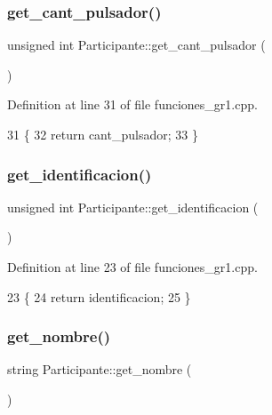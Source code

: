\subsubsection{\texorpdfstring{get\+\_\+cant\+\_\+pulsador()}{get\_cant\_pulsador()}}
{\footnotesize\ttfamily unsigned int Participante\+::get\+\_\+cant\+\_\+pulsador (\begin{DoxyParamCaption}{ }\end{DoxyParamCaption})}



Definition at line 31 of file funciones\+\_\+gr1.\+cpp.


\begin{DoxyCode}
31                                             \{
32     \textcolor{keywordflow}{return} cant\_pulsador;   
33 \}
\end{DoxyCode}
\mbox{\label{classParticipante_ab39d927b0395b10236db2e68dbc21591}} 
\subsubsection{\texorpdfstring{get\+\_\+identificacion()}{get\_identificacion()}}
{\footnotesize\ttfamily unsigned int Participante\+::get\+\_\+identificacion (\begin{DoxyParamCaption}{ }\end{DoxyParamCaption})}



Definition at line 23 of file funciones\+\_\+gr1.\+cpp.


\begin{DoxyCode}
23                                              \{
24     \textcolor{keywordflow}{return} identificacion;      
25 \}
\end{DoxyCode}
\mbox{\label{classParticipante_a693b2864e7d79fb64765b678f92d64e9}} 
\subsubsection{\texorpdfstring{get\+\_\+nombre()}{get\_nombre()}}
{\footnotesize\ttfamily string Participante\+::get\+\_\+nombre (\begin{DoxyParamCaption}{ }\end{DoxyParamCaption})}




